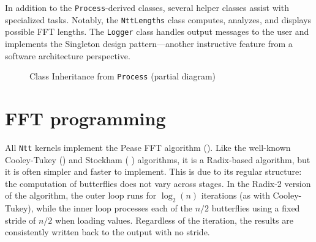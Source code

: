 \documentclass{article}
\begin{document}
In addition to the \texttt{Process}-derived classes, several helper classes assist with specialized tasks. Notably, the \texttt{NttLengths} class computes, analyzes, and displays possible FFT lengths. The \texttt{Logger} class handles output messages to the user and implements the Singleton design pattern—another instructive feature from a software architecture perspective.

\begin{figure}
\caption{Class Inheritance from \texttt{Process} (partial diagram)}
\label{fig:ProcessHierarchy}
\end{figure}

\section{FFT programming}

All \texttt{Ntt} kernels implement the Pease FFT algorithm (\cite{Pea68}). Like the well-known Cooley-Tukey (\cite{CT65}) and Stockham (\cite{Sto66} \cite{CCFHKLMNRW67}) algorithms, it is a Radix-based algorithm, but it is often simpler and faster to implement. This is due to its regular structure: the computation of butterflies does not vary across stages. In the Radix-2 version of the algorithm, the outer loop runs for $\log_2(n)$ iterations (as with Cooley-Tukey), while the inner loop processes each of the $n/2$ butterflies using a fixed stride of $n/2$ when loading values. Regardless of the iteration, the results are consistently written back to the output with no stride.
\end{document}
